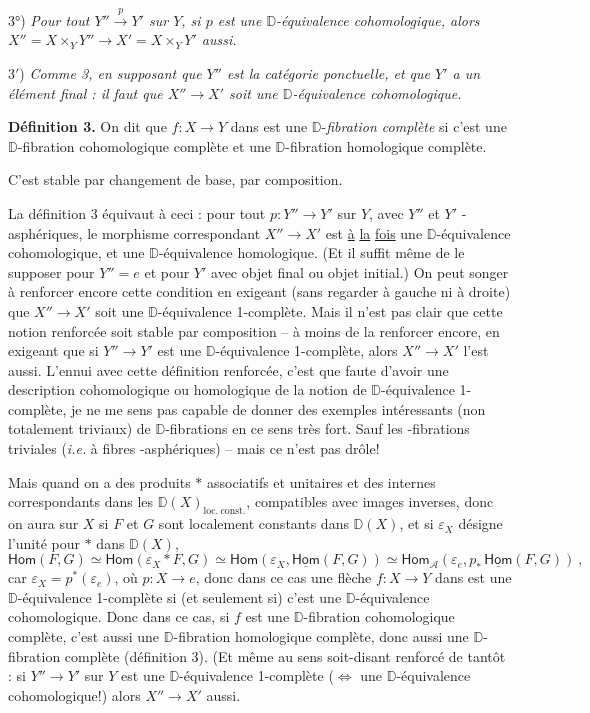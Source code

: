 \documentclass[11pt,leqno]{article}
\newcommand{\msp}[1]{\marginpar{\footnotesize [#1]}}
\newcommand{\DD}{\mathbb{D}}
\newcommand{\Dia}{\mathsf{Dia}}
\newcommand{\Hom}{\mathsf{Hom}}
\newcommand{\Hot}{\mathsf{Hot}}
\begin{document}
3°) \textit{Pour tout $Y'' \overset{p}{\to} Y'$ sur $Y$, si $p$ est une $\DD$-équivalence cohomologique, alors $X'' = X \times_Y Y'' \longrightarrow X' = X \times_Y Y'$ aussi.}

3$'$) \textit{Comme 3, en supposant que $Y''$ est la catégorie ponctuelle, et que $Y'$ a un élément final : il faut que $X'' \to X'$ soit une $\DD$-équivalence cohomologique.}

\msp{page 105}
\textbf{Définition 3.} On dit que $f : X \to Y$ dans \Dia{} est une $\DD$-\textit{fibration complète} si c’est une $\DD$-fibration cohomologique complète et une $\DD$-fibration homologique complète.

C’est stable par changement de base, par composition.

La définition 3 équivaut à ceci : pour tout $p : Y'' \to Y'$ sur $Y$, avec $Y''$ et $Y'$ \Hot-asphériques, le morphisme correspondant $X'' \to X'$ est \underline{à} \underline{la} \underline{fois} une $\DD$-équivalence cohomologique, et une $\DD$-équivalence homologique. (Et il suffit même de le supposer pour $Y'' = e$ et pour $Y'$ avec objet final ou objet initial.) On peut songer à renforcer encore cette condition en exigeant (sans regarder à gauche ni à droite) que $X'' \to X'$ soit une $\DD$-équivalence 1-complète. Mais il n’est pas clair que cette notion renforcée soit stable par composition – à moins de la renforcer encore, en exigeant que si $Y'' \to Y'$ est une $\DD$-équivalence 1-complète, alors $X'' \to X'$ l’est aussi. L’ennui avec cette définition renforcée, c’est que faute d’avoir une description cohomologique ou homologique de la notion de
\msp{page 106}
$\DD$-équivalence 1-complète, je ne me sens pas capable de donner des exemples intéressants (non totalement triviaux) de $\DD$-fibrations en ce sens très fort. Sauf les \Hot-fibrations triviales (\textit{i.e.} à fibres \Hot-asphériques) – mais ce n’est pas drôle!

Mais quand on a des produits $*$ associatifs et unitaires et des \underline{\Hom} internes correspondants dans les $\DD(X)_{\mathrm{loc.\ const.}}$, compatibles avec images inverses, donc on aura sur $X$ si $F$ et $G$ sont localement constants dans $\DD(X)$, et si $\varepsilon_X$ désigne l’unité pour $*$ dans $\DD(X)$,
\[
\Hom(F,G) \simeq \Hom(\varepsilon_X * F, G) \simeq \Hom(\varepsilon_X, \underline{\Hom}(F,G)) \simeq \Hom_{\mathcal{A}}(\varepsilon_e, p_*\, \underline{\Hom}(F,G)) \ ,
\]
car $\varepsilon_X = p^*(\varepsilon_e)$, où $p : X \to e$, donc dans ce cas une flèche $f : X \to Y$ dans \Dia{} est une $\DD$-équivalence 1-complète si (et seulement si) c’est une $\DD$-équivalence cohomologique. Donc dans ce cas, si $f$ est une $\DD$-fibration cohomologique complète, c’est aussi une $\DD$-fibration homologique complète, donc aussi une $\DD$-fibration complète (définition 3). (Et même au sens soit-disant renforcé de tantôt : si $Y'' \to Y'$ sur $Y$ est une $\DD$-équivalence 1-complète ($\Leftrightarrow$ une $\DD$-équivalence cohomologique!) alors $X'' \to X'$ aussi. %
\end{document}
